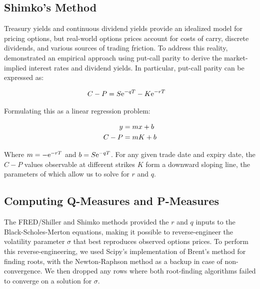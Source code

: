 \documentclass[final,3p,times,authoryear]{elsarticle}
\begin{document}
  \subsection{Shimko's Method}
    Treasury yields and continuous dividend yields provide an idealized model for pricing options, but real-world options prices account for costs of carry, discrete dividends, and various sources of trading friction. To address this reality, \citet{shimko_bounds_1993} demonstrated an empirical approach using put-call parity to derive the market-implied interest rates and dividend yields. In particular, put-call parity can be expressed as:

    \begin{align}
      C - P &= S {\rm e}^{-q T} - K {\rm e}^{-r T}
    \end{align}

    Formulating this as a linear regression problem:

    \begin{align}
      y &= m x + b \notag \\
      C - P &= m K + b
    \end{align}

    Where $m = -{\rm e}^{-r T}$ and $b = S {\rm e}^{-q T}$. For any given trade date and expiry date, the $C - P$ values observable at different strikes $K$ form a downward sloping line, the parameters of which allow us to solve for $r$ and $q$.
    
  \subsection{Computing Q-Measures and P-Measures}
    The FRED/Shiller and Shimko methods provided the $r$ and $q$ inputs to the Black-Scholes-Merton equations, making it possible to reverse-engineer the volatility parameter $\sigma$ that best reproduces observed options prices. To perform this reverse-engineering, we used Scipy's implementation of Brent's method for finding roots, with the Newton-Raphson method as a backup in case of non-convergence. We then dropped any rows where both root-finding algorithms failed to converge on a solution for $\sigma$.
\end{document}
